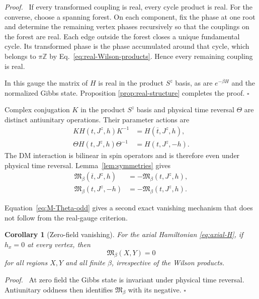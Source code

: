 \documentclass[aps,prb,preprint,nofootinbib,longbibliography]{revtex4-2}
\newcommand{\Mmod}{\mathfrak{M}}
\newtheorem{corollary}[theorem]{Corollary}
\newenvironment{proof}{\par\noindent\textit{Proof.}\ }%
{\unskip\nobreak\hfill\(\square\)\par}
\begin{document}
\begin{proof}
If every transformed coupling is real, every cycle product is real.  For the
converse, choose a spanning forest.  On each component, fix the phase at one
root and determine the remaining vertex phases recursively so that the
couplings on the forest are real.  Each edge outside the forest closes a
unique fundamental cycle.  Its transformed phase is the phase accumulated
around that cycle, which belongs to $\pi\mathbb Z$ by
Eq.~\eqref{eq:real-Wilson-products}.  Hence every remaining coupling is real.

In this gauge the matrix of $H$ is real in the product $S^z$ basis, as are
$e^{-\beta H}$ and the normalized Gibbs state.  Proposition
\ref{prop:real-structure} completes the proof.
\end{proof}

Complex conjugation $K$ in the product $S^z$ basis and physical time reversal
$\Theta$ are distinct antiunitary operations.  Their parameter actions are
\begin{align}
 K H(t,J^z,h)K^{-1}&=H(\overline t,J^z,h),
 \label{eq:K-action}\\
 \Theta H(t,J^z,h)\Theta^{-1}&=H(t,J^z,-h).
 \label{eq:Theta-action}
\end{align}
The DM interaction is bilinear in spin operators and is therefore even under
physical time reversal.  Lemma~\ref{lem:symmetries} gives
\begin{align}
 \Mmod_\beta(\overline t,J^z,h)
 &=-\Mmod_\beta(t,J^z,h),
 \label{eq:M-K-odd}\\
 \Mmod_\beta(t,J^z,-h)
 &=-\Mmod_\beta(t,J^z,h).
 \label{eq:M-Theta-odd}
\end{align}

Equation~\eqref{eq:M-Theta-odd} gives a second exact vanishing mechanism that
does not follow from the real-gauge criterion.

\begin{corollary}[Zero-field vanishing]
\label{cor:zero-field}
For the axial Hamiltonian \eqref{eq:axial-H}, if $h_x=0$ at every vertex,
then
\begin{equation}
 \Mmod_\beta(X,Y)=0
 \label{eq:zero-field-vanishing}
\end{equation}
for all regions $X,Y$ and all finite $\beta$, irrespective of the Wilson
products.
\end{corollary}

\begin{proof}
At zero field the Gibbs state is invariant under physical time reversal.
Antiunitary oddness then identifies $\Mmod_\beta$ with its negative.
\end{proof}
\end{document}

